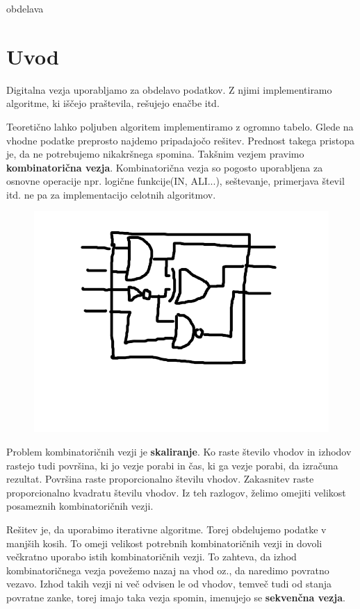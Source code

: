 obdelava%
\chapter{Uvod} \label{uvod}

Digitalna vezja uporabljamo za obdelavo podatkov. Z njimi implementiramo algoritme, ki iščejo praštevila, rešujejo enačbe itd.

Teoretično lahko poljuben algoritem implementiramo z ogromno tabelo. Glede na vhodne podatke preprosto najdemo pripadajočo rešitev. Prednost takega pristopa je, da ne potrebujemo nikakršnega spomina. Takšnim vezjem pravimo \textbf{kombinatorična vezja}. Kombinatorična vezja so pogosto uporabljena za osnovne operacije npr. logične funkcije(IN, ALI...), seštevanje, primerjava števil itd. ne pa za implementacijo celotnih algoritmov.

\begin{figure}[H]
	\centering
	\includegraphics[width=0.7\linewidth]{slike/uvod/comb}
	\caption{}
	\label{fig:comb}
\end{figure}


Problem kombinatoričnih vezji je \textbf{skaliranje}. Ko raste število vhodov in izhodov rastejo tudi površina, ki jo vezje porabi in čas, ki ga vezje porabi, da izračuna rezultat. 
Površina raste proporcionalno številu vhodov.
Zakasnitev raste proporcionalno kvadratu številu vhodov.
Iz teh razlogov, želimo omejiti velikost posameznih kombinatoričnih vezji.

Rešitev je, da uporabimo iterativne algoritme. Torej obdelujemo podatke v manjših kosih. To omeji velikost potrebnih kombinatoričnih vezji in dovoli večkratno uporabo istih kombinatoričnih vezji. To zahteva, da izhod kombinatoričnega vezja povežemo nazaj na vhod oz., da naredimo povratno vezavo. Izhod takih vezji ni več odvisen le od vhodov, temveč tudi od stanja povratne zanke, torej imajo taka vezja spomin, imenujejo se \textbf{sekvenčna vezja}.

